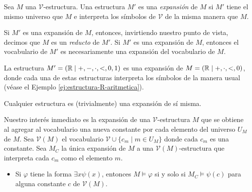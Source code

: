\message{ !name(main.tex)}\documentclass[12pt,a4paper]{book}
\newcommand{\VV}{\mathcal{V}}
\begin{document}
    \begin{definicion}\label{def:expansion-estructura}
        Sea $M$ una $\VV$-estructura. Una estructura $M'$ es una \textit{expansión} de $M$ si $M'$ tiene el mismo universo
        que $M$ e interpreta los símbolos de $\VV$ de la misma manera que $M$.
    \end{definicion}

    Si $M'$ es una expansión de $M$, entonces, invirtiendo nuestro punto de vista, decimos que $M$ es un \textit{reducto}
    de $M'$. Si $M'$ es una expansión de $M$, entonces el vocabulario de $M'$ es necesariamente una expansión del
    vocabulario de $M$.

    \begin{ejemplo}
        La estructura $M'=(\mathbb{R}\mid+,-,\cdot,<,0,1)$ es una expansión de $M=(\mathbb{R}\mid+,\cdot,<,0)$, donde cada una de estas
        estructuras interpreta los símbolos de la manera usual (véase el Ejemplo \ref{ej:estructura-R-aritmetica}).
    \end{ejemplo}

    \begin{ejemplo}
        Cualquier estructura es (trivialmente) una expansión de sí misma.
    \end{ejemplo}

    Nuestro interés inmediato es la expansión de una $\VV$-estructura $M$ que se obtiene al agregar al vocabulario una
    nueva constante por cada elemento del universo $U_{M}$ de $M$. Sea $\VV(M)$ el vocabulario $\VV\cup\{c_{m}\mid m\in U_{M}\}$
    donde cada $c_{m}$ es una constante. Sea $M_{C}$ la única expansión de $M$ a una $\VV(M)$-estructura que interpreta
    cada $c_{m}$ como el elemento $m$.

    \begin{itemize}
        \item[$\bullet$] Si $\varphi$ tiene la forma $\exists x\psi(x)$, entonces $M\models\varphi$ si y solo si
        $M_{C}\models\psi(c)$ para alguna constante $c$ de $\VV(M)$.
    \end{itemize}
\end{document}
